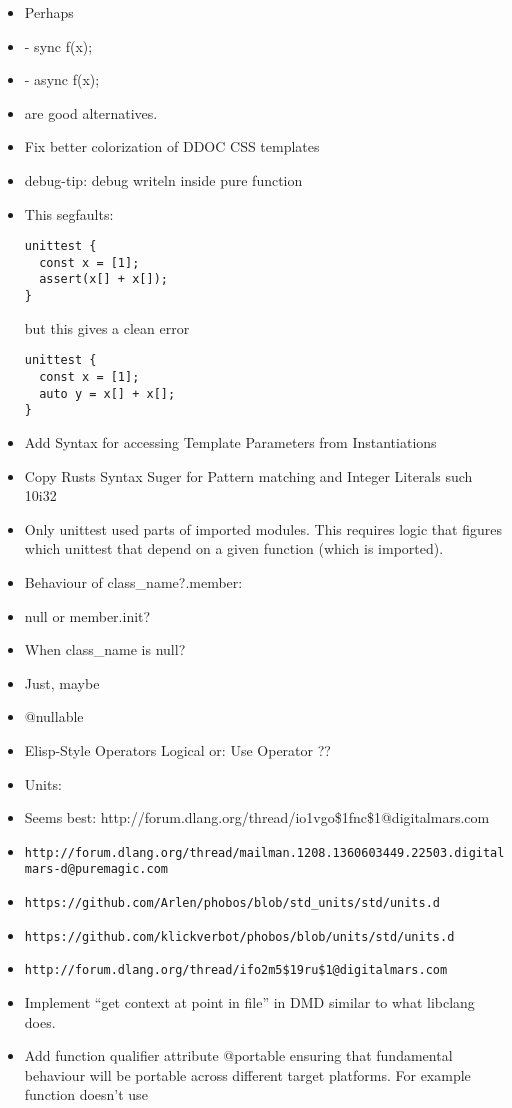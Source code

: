 \documentclass[xcolor=dvipsnames, twocolumn]{article}
\begin{document}
\begin{itemize}
\item Perhaps
\item - sync f(x);
\item - async f(x);
\item are good alternatives.

\item Fix better colorization of DDOC CSS templates

\end{itemize}

\begin{itemize}

\item debug-tip: debug writeln inside pure function

\item This segfaults:
\begin{lstlisting}[frame=single]
unittest {
  const x = [1];
  assert(x[] + x[]);
}
\end{lstlisting}
but this gives a clean error
\begin{lstlisting}[frame=single]
unittest {
  const x = [1];
  auto y = x[] + x[];
}
\end{lstlisting}

\item Add Syntax for accessing Template Parameters from Instantiations
\item Copy Rusts Syntax Suger for Pattern matching and Integer Literals such 10i32
\item Only unittest used parts of imported modules. This requires logic that
  figures which unittest that depend on a given function (which is imported).
\item Behaviour of class\_name?.member:
\item null or member.init?
\item When class\_name is null?
\item Just, maybe
\item @nullable
\item Elisp-Style Operators Logical or: Use Operator ??
\item Units:
\item Seems best: http://forum.dlang.org/thread/io1vgo\$1fnc\$1@digitalmars.com
\item
  \texttt{http://forum.dlang.org/thread/mailman.1208.1360603449.22503.digitalmars-d@puremagic.com}
\item \texttt{https://github.com/Arlen/phobos/blob/std\_units/std/units.d}
\item \texttt{https://github.com/klickverbot/phobos/blob/units/std/units.d}
\item \texttt{http://forum.dlang.org/thread/ifo2m5\$19ru\$1@digitalmars.com}
\item Implement “get context at point in file” in DMD similar to what libclang
  does.
\item Add function qualifier attribute @portable ensuring that fundamental
  behaviour will be portable across different target platforms. For example
  function doesn't use


\end{itemize}
\end{document}
